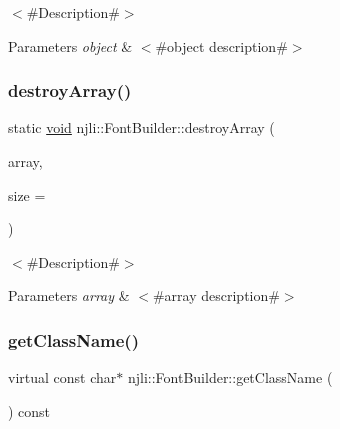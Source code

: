 $<$\#\+Description\#$>$


\begin{DoxyParams}{Parameters}
{\em object} & $<$\#object description\#$>$ \\
\hline
\end{DoxyParams}
\mbox{\label{classnjli_1_1_font_builder_ac5727165800adb54029bfe7a6dde6f0e}} 
\subsubsection{\texorpdfstring{destroy\+Array()}{destroyArray()}}
{\footnotesize\ttfamily static \mbox{\hyperlink{_thread_8h_af1e856da2e658414cb2456cb6f7ebc66}{void}} njli\+::\+Font\+Builder\+::destroy\+Array (\begin{DoxyParamCaption}\item[{\mbox{\hyperlink{classnjli_1_1_font_builder}{Font\+Builder}} $\ast$$\ast$}]{array,  }\item[{const \mbox{\hyperlink{_util_8h_a10e94b422ef0c20dcdec20d31a1f5049}{u32}}}]{size = {} }\end{DoxyParamCaption})\hspace{0.3cm}{\ttfamily [static]}}

$<$\#\+Description\#$>$


\begin{DoxyParams}{Parameters}
{\em array} & $<$\#array description\#$>$ \\
\hline
\end{DoxyParams}
\mbox{\label{classnjli_1_1_font_builder_a6b43a2c86a6ef978900eed403e34d943}} 
\subsubsection{\texorpdfstring{get\+Class\+Name()}{getClassName()}}
{\footnotesize\ttfamily virtual const char$\ast$ njli\+::\+Font\+Builder\+::get\+Class\+Name (\begin{DoxyParamCaption}{ }\end{DoxyParamCaption}) const\hspace{0.3cm}{\ttfamily [virtual]}}

